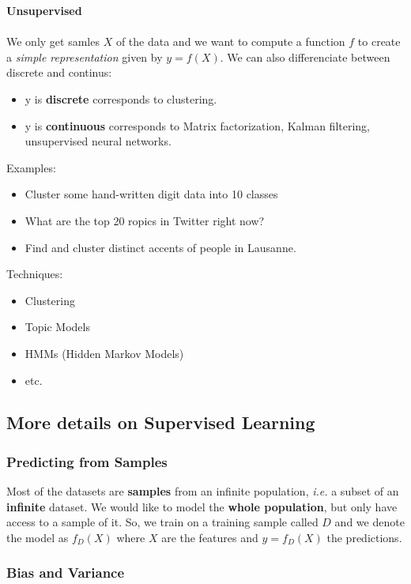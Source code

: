 \textbf{Unsupervised}
\\\\
We only get samles $X$ of the data and we want to compute a function $f$ to create a \emph{simple representation} given by $y = f(X)$. We can also differenciate between discrete and continus:
\begin{itemize}
 \item y is \textbf{discrete} corresponds to clustering.
 \item y is \textbf{continuous} corresponds to Matrix factorization, Kalman filtering, unsupervised neural networks. 
\end{itemize}
Examples:
\begin{itemize}
 \item Cluster some hand-written digit data into 10 classes
 \item What are the top 20 ropics in Twitter right now?
 \item Find and cluster distinct accents of people in Lausanne. 
\end{itemize}
Techniques:
\begin{itemize}
 \item Clustering
 \item Topic Models
 \item HMMs (Hidden Markov Models)
 \item etc.
\end{itemize}

\subsection{More details on Supervised Learning}

\subsubsection{Predicting from Samples}

Most of the datasets are \textbf{samples} from an infinite population, \emph{i.e.} a subset of an \textbf{infinite} dataset. We would like to model the \textbf{whole population}, but only have access to a sample of it. So, we train on a training sample called $D$ and we denote the model as $f_D(X)$ where $X$ are the features and $y=f_D(X)$ the predictions.

\subsubsection{Bias and Variance}

